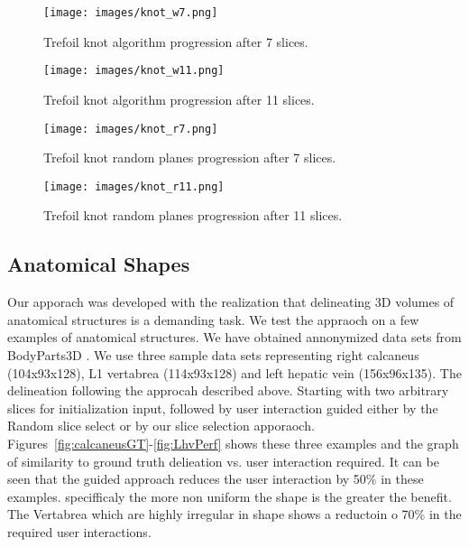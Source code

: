 \clearpage

\begin{figure}[t] 
	\centering
  \texttt{[image: images/knot\_w7.png]}
  \caption[Trefoil Knot Algorithm Progression (1)]{
  Trefoil knot algorithm progression after 7 slices.
  }\label{fig:knot_algo7}
\end{figure}
\begin{figure}[b] 
	\centering
  \texttt{[image: images/knot\_w11.png]}
  \caption[Trefoil Knot Algorithm Progression (2)]{
  Trefoil knot algorithm progression after 11 slices.
  }\label{fig:knot_algo11}
\end{figure}

\clearpage

\begin{figure}[t] 
	\centering
  \texttt{[image: images/knot\_r7.png]}
  \caption[Trefoil Knot Random Planes Progression (1)]{
  Trefoil knot random planes progression after 7 slices.
  }\label{fig:knot_random7}  
\end{figure}
\begin{figure}[b] 
	\centering
  \texttt{[image: images/knot\_r11.png]}
  \caption[Trefoil Knot Random Planes Progression (2)]{
  Trefoil knot random planes progression after 11 slices.
  }\label{fig:knot_random11}  
\end{figure}

\clearpage

\subsection{Anatomical Shapes}

Our apporach was developed with the realization that delineating 3D volumes of anatomical structures is a demanding task. We test the appraoch on a few examples of anatomical structures. We have obtained annonymized data sets from BodyParts3D \cite{MitsuhashiFTKTO09}.
We use three sample data sets representing right calcaneus (104x93x128), L1 vertabrea (114x93x128) and left hepatic vein (156x96x135). The delineation following the approcah described above. Starting with two arbitrary slices for initialization input, followed by user interaction guided either by the Random slice select or by our slice selection apporaoch. Figures~\ref{fig:calcaneusGT}-\ref{fig:LhvPerf} shows these three examples and the graph of similarity to ground truth delieation vs. user interaction required. It can be seen that the guided approach reduces the user interaction by 50\% in these examples. specifficaly the more non uniform the shape is the greater the benefit. The Vertabrea which are highly irregular in shape shows a reductoin o 70\% in the required user interactions.

